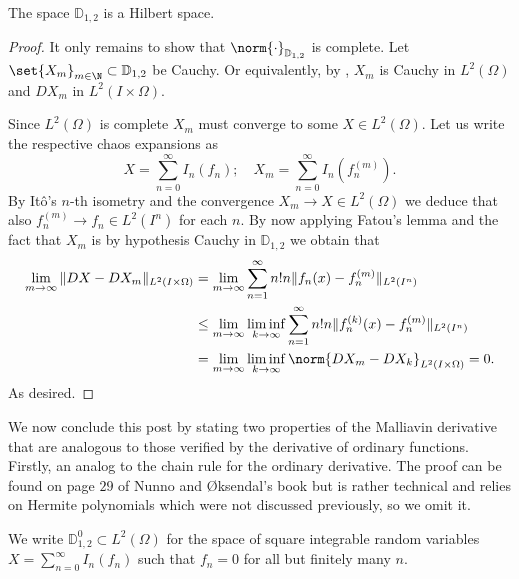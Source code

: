 \documentclass[
    a4paper,
    DIV=14,
    abstract=true,
    numbers=noenddot
]{scrartcl}
\begin{document}
\begin{proposition}
	The space $\mathbb{D}_{1,2}$ is a Hilbert space.
\end{proposition}
\begin{proof}
It only remains to show that $\norm{\cdot }_{\mathbb{D}_{1,2}}$ is complete. Let $\set{X_m}_{m \in \N} \subset  \mathbb{D}_{1,2}$ be Cauchy. Or equivalently, by , $X_m$ is Cauchy in $L^2(\Omega)$ and $DX_m$ in $L^2(I \times \Omega)$.

Since $L^2(\Omega)$ is complete $X_m$ must converge to some  $X\in L^2(\Omega)$. Let us write the respective chaos expansions as
	\begin{equation*}
		X=\sum_{n=0}^{\infty} I_n(f_n);\quad X_m=\sum_{n=0}^{\infty} I_n(f_n^{(m)}).
	\end{equation*}
	By Itô's $n$-th isometry and the convergence $X_m\to X\in L^2(\Omega)$ we deduce that also $f^{(m)}_n\to f_n\in L^2(I^n)$ for each $n$.    By now applying Fatou's lemma and the fact that $X_m$ is by hypothesis Cauchy in  $\mathbb{D}_{1,2}$ we obtain that
	\begin{align*}
		\lim_{m \to \infty}\|DX-DX_m\|_{L^2(I \times \Omega)}&=\lim_{m \to \infty}\sum_{n=1}^{\infty} n!n \|f_n(x)-f_n^{(m)}\|_{L^2(I^n)}\\
		&\leq \lim_{m \to \infty}\liminf_{k \to \infty}\sum_{n=1}^{\infty} n!n \|f_n^{(k)}(x)-f_n^{(m)}\|_{L^2(I^n)}\\
		&=\lim_{m \to \infty}\liminf_{k \to \infty}\norm{DX_m-DX_k}_{L^2(I \times \Omega)}=0.
	\end{align*}
	As desired.
\end{proof}
We now conclude this post by stating two  properties of the Malliavin derivative that are analogous to those verified by the derivative of ordinary functions. Firstly, an analog to the chain rule for the ordinary derivative. The proof can be found on page $29$ of Nunno and Øksendal's book \cite{nunno2008malliavin} but is rather technical and relies on Hermite polynomials which were not discussed previously, so we omit it.
\begin{definition}
	We write $\mathbb{D}_{1,2}^0\subset L^2(\Omega)$ for the space of square integrable random variables $X=\sum_{n=0}^{\infty} I_n(f_n)$ such that $f_n=0$ for all but finitely many  $n$.
\end{definition}
\end{document}
